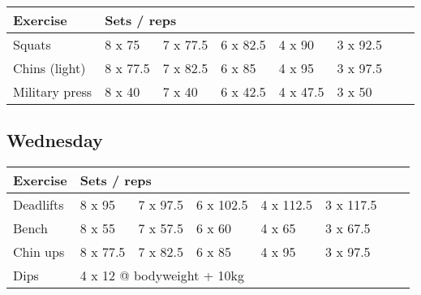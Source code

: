 \documentclass[12pt, a4paper]{article}%
\begin{document}
  \begin{tabular}{l|lllllll}
  \hspace{0.75em} \textbf{Exercise} & \multicolumn{ 7 }{l}{ \textbf{Sets / reps} } \\ \hline

            \hspace{0.75em} Squats
            & 8 x 75
            & 7 x 77.5
            & 6 x 82.5
            & 4 x 90
            & 3 x 92.5
            & 
            & 
            \\


            \hspace{0.75em} Chins (light)
            & 8 x 77.5
            & 7 x 82.5
            & 6 x 85
            & 4 x 95
            & 3 x 97.5
            & 
            & 
            \\


            \hspace{0.75em} Military press
            & 8 x 40
            & 7 x 40
            & 6 x 42.5
            & 4 x 47.5
            & 3 x 50
            & 
            & 
            \\


  \end{tabular}

  \subsection*{\hspace{0.5em} Wednesday }


  \begin{tabular}{l|lllllll}
  \hspace{0.75em} \textbf{Exercise} & \multicolumn{ 7 }{l}{ \textbf{Sets / reps} } \\ \hline

            \hspace{0.75em} Deadlifts
            & 8 x 95
            & 7 x 97.5
            & 6 x 102.5
            & 4 x 112.5
            & 3 x 117.5
            & 
            & 
            \\


            \hspace{0.75em} Bench
            & 8 x 55
            & 7 x 57.5
            & 6 x 60
            & 4 x 65
            & 3 x 67.5
            & 
            & 
            \\


            \hspace{0.75em} Chin ups
            & 8 x 77.5
            & 7 x 82.5
            & 6 x 85
            & 4 x 95
            & 3 x 97.5
            & 
            & 
            \\


   \hspace{0.75em} Dips &  \multicolumn{ 7 }{l}{ 4 x 12 @ bodyweight + 10kg } \\
  \end{tabular}
\end{document}
